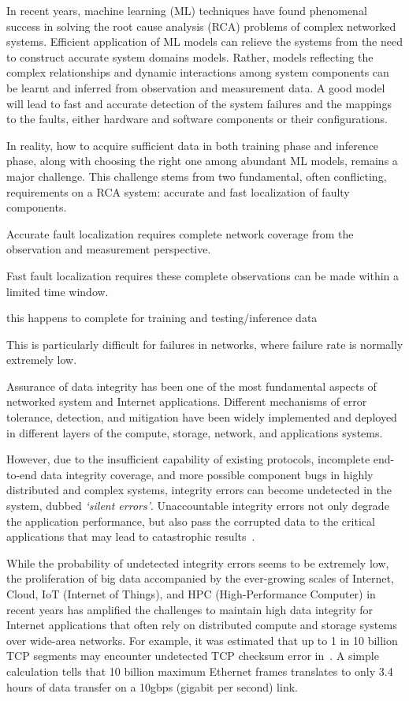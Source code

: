 In recent years, machine learning (ML) techniques have found phenomenal success in solving the root cause analysis (RCA) problems of complex networked systems.
Efficient application of ML models can relieve the systems from the need to construct accurate system domains models. Rather, models reflecting the complex relationships 
and dynamic interactions among system components can be learnt and inferred from observation and measurement data. A good model will lead to fast and accurate detection of 
the system failures and the mappings to the faults, either hardware and software components or their configurations.  

In reality, how to acquire sufficient data in both training phase and inference phase, along with choosing the right one among abundant ML models, remains a major challenge.  
This challenge stems from two fundamental, often conflicting, requirements on a RCA system: accurate and fast localization of faulty components. 

 
Accurate fault localization requires complete network coverage from the observation and measurement perspective. 
 
 Fast fault localization requires these complete observations can be made within a limited time window.  
 
this happens to complete for training and testing/inference data

This is particularly difficult for failures in networks, where failure rate is normally extremely low. 

Assurance of data integrity has been one of the most fundamental aspects of networked system and Internet applications.
Different mechanisms of error tolerance, detection, and mitigation have been widely implemented and deployed in different layers of 
the compute, storage, network, and applications systems.

However, due to the insufficient capability of existing protocols, incomplete end-to-end data integrity coverage, 
and more possible component bugs in highly distributed and complex systems, integrity errors can become undetected in 
the system, dubbed {\it `silent errors'}.  Unaccountable integrity errors not only degrade the application performance, but also pass the corrupted data
to the critical applications that may lead to catastrophic results~\cite{Jung2019HighPerformanceEI}.

While the probability of undetected integrity errors seems to be extremely low, the proliferation of big data accompanied by the ever-growing scales of Internet, 
Cloud, IoT (Internet of Things), and HPC (High-Performance Computer) in recent years has amplified the challenges to maintain high data integrity for 
Internet applications that often rely on distributed compute and storage systems over wide-area networks. For example, it was estimated that up to 1 in 10 billion 
TCP segments may encounter undetected TCP checksum error in~\cite{tcp:ccr2000}. A simple calculation tells that 10 billion maximum Ethernet frames translates to 
only 3.4 hours of data transfer on a 10gbps (gigabit per second) link. 

